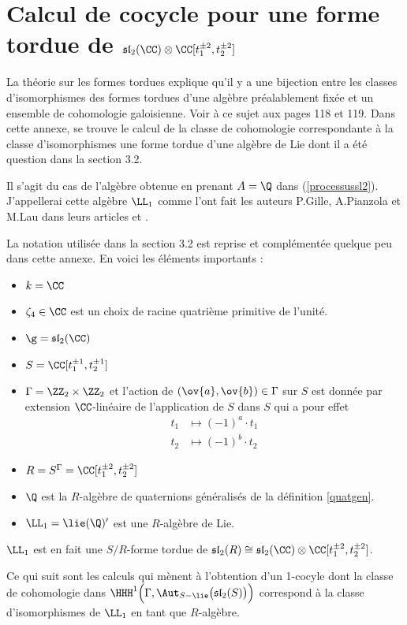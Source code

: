 \chapter{Calcul de cocycle pour une forme tordue de $\mathfrak{sl}_2(\CC) \otimes \CC[t_1^{\pm 2},t_2^{\pm 2}]$}     %

La théorie sur les formes tordues explique qu'il y a une bijection entre les classes d'isomorphismes des formes tordues d'une algèbre préalablement fixée et un ensemble de cohomologie galoisienne. Voir à ce sujet \cite{Bgalois} aux pages 118 et 119. Dans cette annexe, se trouve le calcul de la classe de cohomologie correspondante à  la classe d'isomorphismes une forme tordue d'une algèbre de Lie dont il a été question dans la section 3.2. 

Il s'agit du cas de l'algèbre obtenue en prenant $A = \Q$ dans (\ref{processussl2}). J'appellerai cette algèbre $\LL_1$ comme l'ont fait les auteurs P.Gille, A.Pianzola et M.Lau dans leurs articles \cite{GPmar} et \cite{LPtfa}.

La notation utilisée dans la section 3.2 est reprise et complémentée quelque peu dans cette annexe. En voici les éléments importants :
\begin{itemize}
\item[\textbullet] $k = \CC$
\item[\textbullet] $\zeta_4 \in \CC$ est un choix de racine quatri\`eme primitive de l'unit\'e.
\item[\textbullet] $\g = \mathfrak{sl}_2(\CC)$
\item[\textbullet] $S = \CC[t_1^{\pm 1},t_2^{\pm 1}]$
\item[\textbullet] $\Gamma = \ZZ_2 \times \ZZ_2$ et l'action de $(\ov{a},\ov{b}) \in \Gamma$ sur $S$ est donnée par extension $\CC$-linéaire de l'application de $S$ dans $S$ qui a pour effet
\begin{align*} 
t_1 &\mapsto (-1)^a \cdot t_1\\
t_2 &\mapsto (-1)^b \cdot t_2
\end{align*}
\item[\textbullet] $R = S^\Gamma = \CC[t_1^{\pm 2},t_2^{\pm 2}]$
\item[\textbullet] $\Q$ est la $R$-algèbre de quaternions généralisés de la définition \ref{quatgen}.
\item[\textbullet] $\LL_1 = \lie(\Q)'$ est une $R$-algèbre de Lie. 
\end{itemize}

\begin{annexeRem} $\LL_1$ est en fait une $S/R$-forme tordue de $\mathfrak{sl}_2(R) \cong \mathfrak{sl}_2(\CC) \otimes \CC[t_1^{\pm 2},t_2^{\pm 2}]$.

Ce qui suit sont les calculs qui mènent à l'obtention d'un 1-cocyle dont la classe de cohomologie dans $\HHH^1\Big(\Gamma,\Aut_{S-\lie}\big(\mathfrak{sl}_2(S)\big)\Big)$ correspond à la classe d'isomorphismes de $\LL_1$ en tant que \linebreak $R$-algèbre.
\end{annexeRem}



